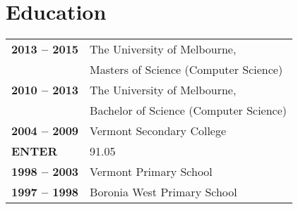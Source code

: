 \documentclass[a4paper]{article}
\begin{document}
\section{Education}
\begin{tabular}{>{\raggedright}m{3cm} l}
    \textbf{2013 -- 2015} &The University of Melbourne, \\
                             &Masters of Science (Computer Science)\\
    \textbf{2010 -- 2013} &The University of Melbourne, \\
                             &Bachelor of Science (Computer Science)\\
    \textbf{2004 -- 2009} &Vermont Secondary College\\
           \textbf{ENTER} &91.05\\
    \textbf{1998 -- 2003} &Vermont Primary School\\
    \textbf{1997 -- 1998} &Boronia West Primary School\\
\end{tabular}
\end{document}
